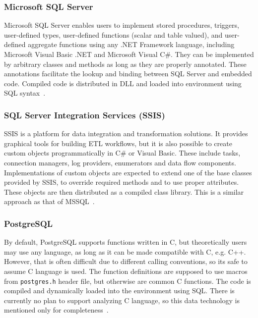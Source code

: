 \subsubsection{Microsoft SQL Server}
Microsoft SQL Server enables users to implement stored procedures, triggers, user-defined types, user-defined functions (scalar and table valued), and user-defined aggregate functions using any .NET Framework language, including Microsoft Visual Basic .NET and Microsoft Visual C\#. They can be implemented by arbitrary classes and methods as long as they are properly annotated. These annotations facilitate the lookup and binding between SQL Server and embedded code. Compiled code is distributed in DLL and loaded into environment using SQL syntax~\cite{mssql}.

\subsubsection{SQL Server Integration Services (SSIS)}
SSIS is a platform for data integration and transformation solutions. It provides graphical tools for building ETL workflows, but it is also possible to create custom objects programmatically in C\# or Visual Basic. These include tasks, connection managers, log providers, enumerators and data flow components. Implementations of custom objects are expected to extend one of the base classes provided by SSIS, to override required methods and to use proper attributes. These objects are then distributed as a compiled class library. This is a similar approach as that of MSSQL~\cite{ssis}.

\subsubsection{PostgreSQL}
By default, PostgreSQL supports functions written in C, but theoretically users may use any language, as long as it can be made compatible with C, e.g. C++. However, that is often difficult due to different calling conventions, so its safe to assume C language is used. The function definitions are supposed to use macros from \texttt{postgres.h} header file, but otherwise are common C functions. The code is compiled and dynamically loaded into the environment using SQL. There is currently no plan to support analyzing C language, so this data technology is mentioned only for completeness~\cite{postgresql}.


